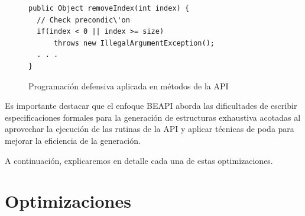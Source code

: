 \begin{figure}[!thb]
\begin{lstlisting}
public Object removeIndex(int index) {
  // Check precondic\'on
  if(index < 0 || index >= size)
      throws new IllegalArgumentException();  
  . . .
}

\end{lstlisting}
\caption{Programación defensiva aplicada en métodos de la API}
\label{fig:algoProgDefensiva}
\end{figure}


Es importante destacar que el enfoque \textsf{BEAPI} aborda las dificultades de escribir especificaciones formales para la generación de estructuras exhaustiva acotadas al aprovechar la ejecución de las rutinas de la API y aplicar técnicas de poda para mejorar la eficiencia de la generación.





A continuación, explicaremos en detalle cada una de estas optimizaciones.


\section{Optimizaciones}
